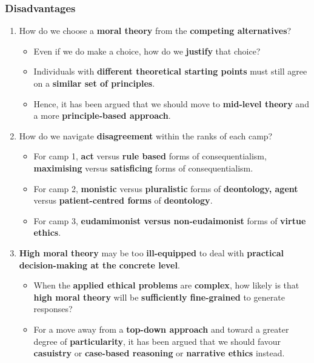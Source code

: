 \documentclass[11pt]{article}
\begin{document}
\subsubsection{Disadvantages}
\label{sec:orgd0c4230}
\begin{enumerate}
\item How do we choose a \textbf{moral theory} from the \textbf{competing alternatives}?
\begin{itemize}
\item Even if we do make a choice, how do we \textbf{justify} that choice?
\item Individuals with \textbf{different theoretical starting points} must still agree on a \textbf{similar set of principles}.
\item Hence, it has been argued that we should move to \textbf{mid-level theory} and a more \textbf{principle-based approach}.
\end{itemize}
\item How do we navigate \textbf{disagreement} within the ranks of each camp?
\begin{itemize}
\item For camp 1, \textbf{act} versus \textbf{rule based} forms of consequentialism, \textbf{maximising} versus \textbf{satisficing} forms of consequentialism.
\item For camp 2, \textbf{monistic} versus \textbf{pluralistic} forms of \textbf{deontology, agent} versus \textbf{patient-centred forms} of \textbf{deontology}.
\item For camp 3, \textbf{eudamimonist versus non-eudaimonist} forms of \textbf{virtue ethics}.
\end{itemize}
\item \textbf{High moral theory} may be too \textbf{ill-equipped} to deal with \textbf{practical decision-making at the concrete level}.
\begin{itemize}
\item When the \textbf{applied ethical problems} are \textbf{complex}, how likely is that \textbf{high moral theory} will be \textbf{sufficiently fine-grained} to generate responses?
\item For a move away from a \textbf{top-down approach} and toward a greater degree of \textbf{particularity}, it has been argued that we should favour \textbf{casuistry} or \textbf{case-based reasoning} or \textbf{narrative ethics} instead.
\end{itemize}
\end{enumerate}
\end{document}
